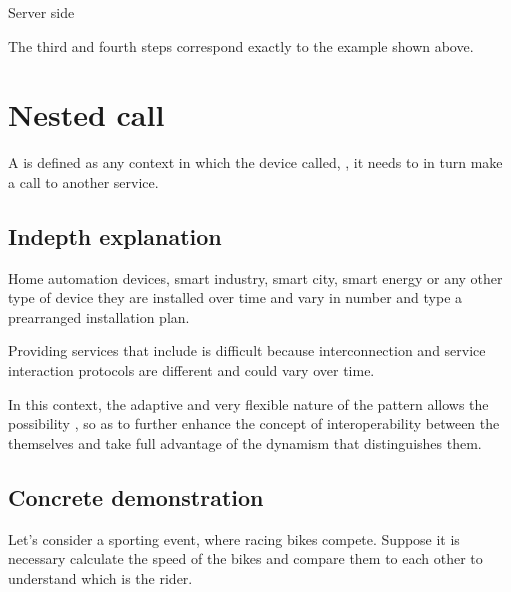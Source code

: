 \documentclass[a4paper,10pt,english,openany,oneside]{sphinxmanual}
\begin{document}
\begin{description}
\begin{description}
\item[{Server side}] \leavevmode
\begin{sphinxVerbatim}[commandchars=\\\{\}]
 \PYG{p}{[}\PYG{p}{]} 
    \PYG{p}{[}\PYG{p}{]}  
\end{sphinxVerbatim}

\end{description}

\end{description}

The third and fourth steps correspond exactly to the example shown above.


\section{Nested call}
\label{\detokenize{example:nested-call}}
A  is defined as any context in which the device called, , it needs to in turn make a call to another service.


\subsection{In\sphinxhyphen{}depth explanation}
\label{\detokenize{example:in-depth-explanation}}
Home automation devices, smart industry, smart city, smart energy or any other type of device
they are installed over time and vary in number and type  a pre\sphinxhyphen{}arranged installation plan.

Providing services that include  is difficult because interconnection
and service interaction protocols are different and could vary over time.

In this context, the adaptive and very flexible nature of the pattern allows the
possibility , so as to further enhance the concept
of interoperability between the themselves and take full advantage of the
dynamism that distinguishes them.


\subsection{Concrete demonstration}
\label{\detokenize{example:concrete-demonstration}}
Let’s consider a sporting event, where racing bikes compete. Suppose it
is necessary calculate the speed of the bikes and compare them to
each other to understand which is the  rider.
\end{document}

